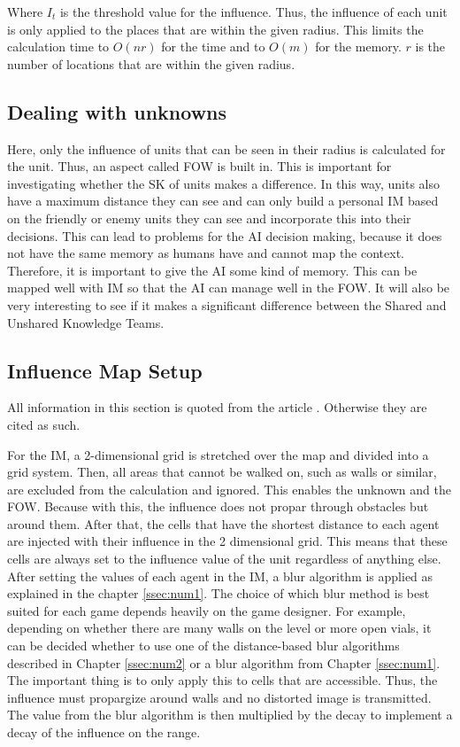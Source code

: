 \documentclass[]{report}
\begin{document}
	Where $I_t$ is the threshold value for the influence. Thus, the influence of each unit is only applied to the places that are within the given radius. This limits the calculation time to $O(nr)$ for the time and to $O(m)$ for the memory. $r$ is the number of locations that are within the given radius.
	
	\subsection{Dealing with unknowns} \label{ssec:dwu}
	Here, only the influence of units that can be seen in their radius is calculated for the unit. Thus, an aspect called \ac{FOW} is built in. This is important for investigating whether the \ac{SK} of units makes a difference. In this way, units also have a maximum distance they can see and can only build a personal \ac{IM} based on the friendly or enemy units they can see and incorporate this into their decisions. This can lead to problems for the \ac{AI} decision making, because it does not have the same memory as humans have and cannot map the context. Therefore, it is important to give the \ac{AI} some kind of memory. This can be mapped well with IM so that the \ac{AI} can manage well in the \ac{FOW}. It will also be very interesting to see if it makes a significant difference between the Shared and Unshared Knowledge Teams.
	
	\subsection{Influence Map Setup}
	All information in this section is quoted from the article \citep{gameDevInfluenceMap}. Otherwise they are cited as such. \newline
	
	For the \ac{IM}, a 2-dimensional grid is stretched over the map and divided into a grid system. Then, all areas that cannot be walked on, such as walls or similar, are excluded from the calculation and ignored. This enables the unknown and the FOW. Because with this, the influence does not propar through obstacles but around them. After that, the cells that have the shortest distance to each agent are injected with their influence in the 2 dimensional grid. This means that these cells are always set to the influence value of the unit regardless of anything else. After setting the values of each agent in the IM, a blur algorithm is applied as explained in the chapter \ref{ssec:num1}. The choice of which blur method is best suited for each game depends heavily on the game designer. For example, depending on whether there are many walls on the level or more open vials, it can be decided whether to use one of the distance-based blur algorithms described in Chapter \ref{ssec:num2} or a blur algorithm from Chapter \ref{ssec:num1}. The important thing is to only apply this to cells that are accessible. Thus, the influence must propargize around walls and no distorted image is transmitted. The value from the blur algorithm is then multiplied by the decay to implement a decay of the influence on the range. 
	
\end{document}
